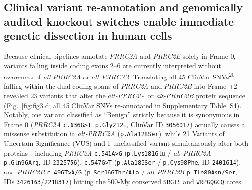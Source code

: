 \documentclass[10pt,letterpaper]{article}
\newcommand{\gene}[1]{\textit{#1}}
\newcommand{\refsup}[1]{\textsuperscript{#1}}
\begin{document}
\subsection{Clinical variant re-annotation and genomically audited knockout switches enable immediate genetic dissection in human cells}

Because clinical pipelines annotate \gene{PRRC2A} and \gene{PRRC2B} solely in Frame 0, variants falling inside coding exons 2--6 are currently interpreted without awareness of \gene{alt-PRRC2A} or \gene{alt-PRRC2B}. Translating all 45 ClinVar SNVs\refsup{20} falling within the dual-coding spans of \gene{PRRC2A} and \gene{PRRC2B} into Frame +2 revealed 23 variants that alter the \gene{alt-PRRC2A} or \gene{alt-PRRC2B} protein sequence (Fig.~\ref{fig:fig3}d; all 45 ClinVar SNVs re-annotated in Supplementary Table~S4). Notably, one variant classified as ``Benign'' strictly because it is synonymous in Frame 0 (\gene{PRRC2A} \texttt{c.636G>T}, \texttt{p.Gly212=}, ClinVar ID \texttt{3056017}) actually causes a missense substitution in \gene{alt-PRRC2A} (\texttt{p.Ala128Ser}), while 21 Variants of Uncertain Significance (VUS) and 1 unclassified variant simultaneously alter both proteins---including \gene{PRRC2A} \texttt{c.541A>G} (\texttt{p.Lys181Glu} / \gene{alt-PRRC2A} \texttt{p.Gln96Arg}, ID \texttt{2325756}), \texttt{c.547G>T} (\texttt{p.Ala183Ser} / \texttt{p.Cys98Phe}, ID \texttt{2401614}), and \gene{PRRC2B} \texttt{c.496T>A/G} (\texttt{p.Ser166Thr/Ala} / \gene{alt-PRRC2B} \texttt{p.Ile80Asn/Ser}, IDs \texttt{3426163}/\texttt{2218317}) hitting the 500-My conserved \texttt{SRGIS} and \texttt{WRPGQGCQ} cores.
\end{document}
